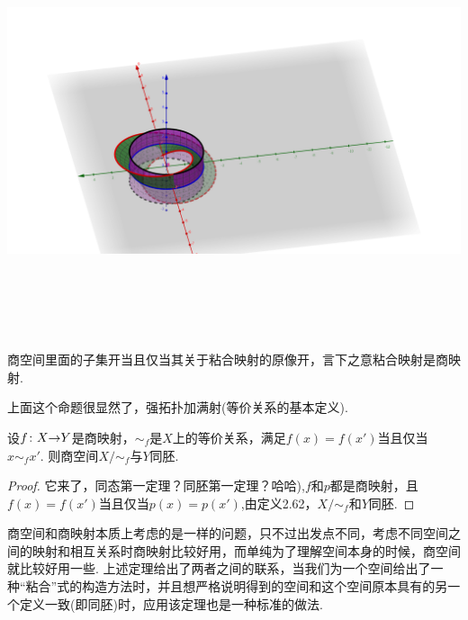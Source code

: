 \begin{example}
\begin{center}
\includegraphics[width=20cm, height=12cm]{images/gluing.png}
\end{center}
\end{example}


\begin{proposition}
商空间里面的子集开当且仅当其关于粘合映射的原像开，言下之意粘合映射是商映射.
\end{proposition}

上面这个命题很显然了，强拓扑加满射(等价关系的基本定义).

\begin{theorem}
设${f}\colon{X}{\to}{Y}$是商映射，$\sim_f$是$X$上的等价关系，满足$f(x)=f(x')$当且仅当$x \sim_f x'$. 则商空间$X / \sim_f$与$Y$同胚.
\end{theorem}

\begin{proof}
它来了，同态第一定理？同胚第一定理？哈哈),$f$和$p$都是商映射，且$f(x)=f(x')$当且仅当$p(x)=p(x')$,由定义2.62，$X / \sim_f$和$Y$同胚.
\end{proof}

商空间和商映射本质上考虑的是一样的问题，只不过出发点不同，考虑不同空间之间的映射和相互关系时商映射比较好用，而单纯为了理解空间本身的时候，商空间就比较好用一些. 上述定理给出了两者之间的联系，当我们为一个空间给出了一种“粘合”式的构造方法时，并且想严格说明得到的空间和这个空间原本具有的另一个定义一致(即同胚)时，应用该定理也是一种标准的做法.

